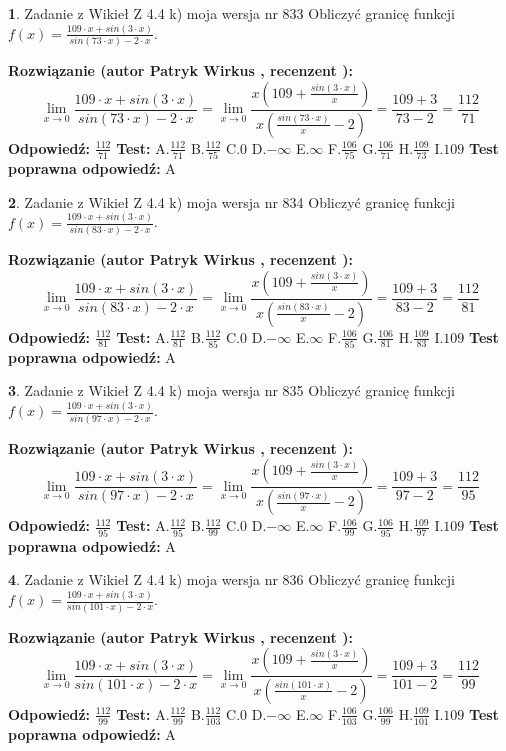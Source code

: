 \documentclass[12pt, a4paper]{article}
\theoremstyle{definition} %
\newtheorem{zad}{}
\newcommand{\zadStart}[1]{\begin{zad}#1\newline}
\newcommand{\zadStop}{\end{zad}}
\newcommand{\rozwStart}[2]{\noindent \textbf{Rozwiązanie (autor #1 , recenzent #2): }\newline}
\newcommand{\rozwStop}{\newline}
\newcommand{\odpStart}{\noindent \textbf{Odpowiedź:}\newline}
\newcommand{\odpStop}{\newline}
\newcommand{\testStart}{\noindent \textbf{Test:}\newline}
\newcommand{\testStop}{\newline}
\newcommand{\kluczStart}{\noindent \textbf{Test poprawna odpowiedź:}\newline}
\newcommand{\kluczStop}{\newline}
\begin{document}
\zadStart{Zadanie z Wikieł Z 4.4 k) moja wersja nr 833}
Obliczyć granicę funkcji $f(x)=\frac{109\cdot x +sin(3\cdot x)}{sin(73\cdot x) -2\cdot x}$.
\zadStop
\rozwStart{Patryk Wirkus}{}
$$\lim\limits_{x\to 0}\frac{109\cdot x +sin(3\cdot x)}{sin(73\cdot x) -2\cdot x}
=\lim\limits_{x\to 0}\frac{x(109+\frac{sin(3\cdot x)}{x})}{x(\frac{sin(73\cdot x)}{x}-2)}
=\frac{109+3}{73-2} = \frac{112}{71}$$
\rozwStop
\odpStart
$\frac{112}{71}$
\odpStop
\testStart
A.$\frac{112}{71}$
B.$\frac{112}{75}$
C.$0$
D.$-\infty$
E.$\infty$
F.$\frac{106}{75}$
G.$\frac{106}{71}$
H.$\frac{109}{73}$
I.$109$
\testStop
\kluczStart
A
\kluczStop



\zadStart{Zadanie z Wikieł Z 4.4 k) moja wersja nr 834}
Obliczyć granicę funkcji $f(x)=\frac{109\cdot x +sin(3\cdot x)}{sin(83\cdot x) -2\cdot x}$.
\zadStop
\rozwStart{Patryk Wirkus}{}
$$\lim\limits_{x\to 0}\frac{109\cdot x +sin(3\cdot x)}{sin(83\cdot x) -2\cdot x}
=\lim\limits_{x\to 0}\frac{x(109+\frac{sin(3\cdot x)}{x})}{x(\frac{sin(83\cdot x)}{x}-2)}
=\frac{109+3}{83-2} = \frac{112}{81}$$
\rozwStop
\odpStart
$\frac{112}{81}$
\odpStop
\testStart
A.$\frac{112}{81}$
B.$\frac{112}{85}$
C.$0$
D.$-\infty$
E.$\infty$
F.$\frac{106}{85}$
G.$\frac{106}{81}$
H.$\frac{109}{83}$
I.$109$
\testStop
\kluczStart
A
\kluczStop



\zadStart{Zadanie z Wikieł Z 4.4 k) moja wersja nr 835}
Obliczyć granicę funkcji $f(x)=\frac{109\cdot x +sin(3\cdot x)}{sin(97\cdot x) -2\cdot x}$.
\zadStop
\rozwStart{Patryk Wirkus}{}
$$\lim\limits_{x\to 0}\frac{109\cdot x +sin(3\cdot x)}{sin(97\cdot x) -2\cdot x}
=\lim\limits_{x\to 0}\frac{x(109+\frac{sin(3\cdot x)}{x})}{x(\frac{sin(97\cdot x)}{x}-2)}
=\frac{109+3}{97-2} = \frac{112}{95}$$
\rozwStop
\odpStart
$\frac{112}{95}$
\odpStop
\testStart
A.$\frac{112}{95}$
B.$\frac{112}{99}$
C.$0$
D.$-\infty$
E.$\infty$
F.$\frac{106}{99}$
G.$\frac{106}{95}$
H.$\frac{109}{97}$
I.$109$
\testStop
\kluczStart
A
\kluczStop



\zadStart{Zadanie z Wikieł Z 4.4 k) moja wersja nr 836}
Obliczyć granicę funkcji $f(x)=\frac{109\cdot x +sin(3\cdot x)}{sin(101\cdot x) -2\cdot x}$.
\zadStop
\rozwStart{Patryk Wirkus}{}
$$\lim\limits_{x\to 0}\frac{109\cdot x +sin(3\cdot x)}{sin(101\cdot x) -2\cdot x}
=\lim\limits_{x\to 0}\frac{x(109+\frac{sin(3\cdot x)}{x})}{x(\frac{sin(101\cdot x)}{x}-2)}
=\frac{109+3}{101-2} = \frac{112}{99}$$
\rozwStop
\odpStart
$\frac{112}{99}$
\odpStop
\testStart
A.$\frac{112}{99}$
B.$\frac{112}{103}$
C.$0$
D.$-\infty$
E.$\infty$
F.$\frac{106}{103}$
G.$\frac{106}{99}$
H.$\frac{109}{101}$
I.$109$
\testStop
\kluczStart
A
\kluczStop
\end{document}
